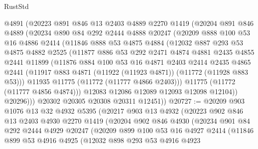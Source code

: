 \begin{lexlean}{RustStd}
\begin{coremodule}
      @4891
      (@20223
        @891
        @846
        @13
        @2403
        @4889
        @2270
        @1419
        (@20204
          @891
          @846
          @4889
          (@20234
            @890
            @84
            @292
            @2444
            @4888
            @20247
            (@20209
              @888
              @100
              @53
              @16
              @4886
              @2414
              (@11846
                @888
                @53
                @4875
                @4884
                (@12032
                  @887
                  @293
                  @53
                  @4875
                  @4882
                  @2525
                  (@11877
                    @886
                    @53
                    @292
                    @2471
                    @4874
                    @4881
                    @2435
                    @4855
                    @2441
                    @11899
                    (@11876
                      @884
                      @100
                      @53
                      @16
                      @4871
                      @2403
                      @2414
                      @2435
                      @4865
                      @2441
                      (@11917 @883 @4871 (@11922 (@11923 @4871)) (@11772 (@11928 @883 @53)))
                      @11935
                      @11775
                      (@11772 (@11777 @4866 @2403)))
                    @11775
                    (@11772 (@11777 @4856 @4874)))
                  @12083
                  @12086
                  @12089
                  @12093
                  @12098
                  @12104))
              @20296)))
        @20302
        @20305
        @20308
        @20311
        @12451))
@20727 := @20209
    @903
    @1076
    @13
    @32
    @4932
    @5395
    (@20217
      @903
      @13
      @4932
      (@20223
        @902
        @846
        @13
        @2403
        @4930
        @2270
        @1419
        (@20204
          @902
          @846
          @4930
          (@20234
            @901
            @84
            @292
            @2444
            @4929
            @20247
            (@20209
              @899
              @100
              @53
              @16
              @4927
              @2414
              (@11846
                @899
                @53
                @4916
                @4925
                (@12032
                  @898
                  @293
                  @53
                  @4916
                  @4923

\end{coremodule}
\end{lexlean}
